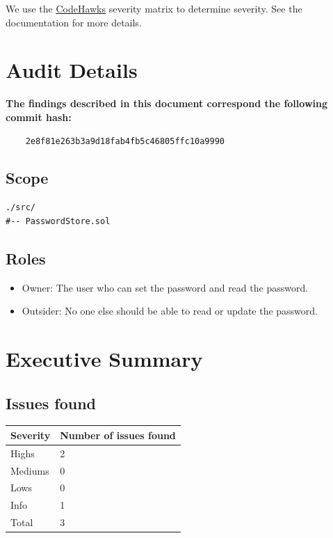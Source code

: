 \documentclass[
  paper=a4,
  ,captions=tableheading
]{scrartcl}
\providecommand{\tightlist}{%
  \setlength{\itemsep}{0pt}\setlength{\parskip}{0pt}}
\begin{document}
We use the
\href{https://docs.codehawks.com/hawks-auditors/how-to-evaluate-a-finding-severity}{CodeHawks}
severity matrix to determine severity. See the documentation for more
details.

\section{Audit Details}\label{audit-details}

\textbf{The findings described in this document correspond the following
commit hash:}

\begin{verbatim}
    2e8f81e263b3a9d18fab4fb5c46805ffc10a9990
\end{verbatim}

\subsection{Scope}\label{scope}

\begin{verbatim}
./src/
#-- PasswordStore.sol
\end{verbatim}

\subsection{Roles}\label{roles}

\begin{itemize}
\tightlist
\item
  Owner: The user who can set the password and read the password.
\item
  Outsider: No one else should be able to read or update the password.
\end{itemize}

\section{Executive Summary}\label{executive-summary}

\subsection{Issues found}\label{issues-found}

{\def\LTcaptype{none} %
\begin{longtable}[]{@{}ll@{}}
\toprule\noalign{}
Severity & Number of issues found \\
\midrule\noalign{}
\endhead
\bottomrule\noalign{}
\endlastfoot
Highs & 2 \\
Mediums & 0 \\
Lows & 0 \\
Info & 1 \\
Total & 3 \\
\end{longtable}
}
\end{document}
